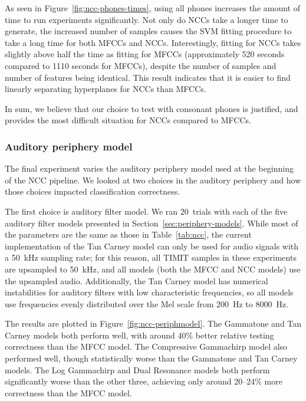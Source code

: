 
As seen in Figure~\ref{fig:ncc-phones-times},
using all phones increases the
amount of time to run experiments significantly.
Not only do NCCs take a longer time to generate,
the increased number of samples
causes the SVM fitting procedure
to take a long time
for both MFCCs and NCCs.
Interestingly, fitting for NCCs
takes slightly above half
the time as fitting for MFCCs
(approximately 520 seconds
compared to 1110 seconds for MFCCs),
despite the number of samples
and number of features being identical.
This result indicates that it is
easier to find linearly separating hyperplanes
for NCCs than MFCCs.

In sum, we believe that our choice to
test with consonant phones
is justified,
and provides the most difficult
situation for NCCs compared to MFCCs.

\subsubsection{Auditory periphery model}
\label{sec:results-periphmodel}

The final experiment varies the auditory periphery model
used at the beginning of the NCC pipeline.
We looked at two choices in the auditory periphery
and how those choices impacted classification correctness.

The first choice is auditory filter model.
We ran 20~trials with each of the five
auditory filter models presented
in Section~\ref{sec:periphery-models}.
While most of the parameters are the same
as those in Table~\ref{tab:ncc},
the current implementation of the Tan Carney model
can only be used for audio signals
with a 50~kHz sampling rate;
for this reason, all TIMIT samples
in these experiments
are upsampled to 50~kHz,
and all models (both the MFCC and NCC models)
use the upsampled audio.
Additionally, the Tan Carney model
has numerical instabilities for auditory filters
with low characteristic frequencies,
so all models use frequencies
evenly distributed over the Mel scale
from 200~Hz to 8000~Hz.


The results are plotted
in Figure~\ref{fig:ncc-periphmodel}.
The Gammatone and Tan Carney models
both perform well,
with around 40\% better relative testing correctness
than the MFCC model.
The Compressive Gammachirp model
also performed well,
though statistically worse
than the Gammatone and Tan Carney models.
The Log Gammachirp and Dual Resonance models
both perform significantly worse
than the other three,
achieving only around 20--24\%
more correctness than the MFCC model.

